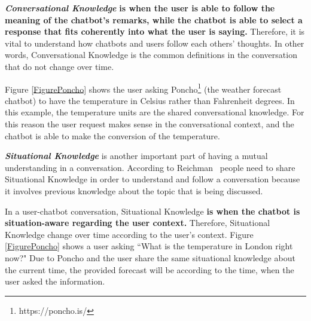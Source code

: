 \documentclass[a4paper,10pt]{article}
\begin{document}

\textbf{\textit{Conversational Knowledge}} \textbf{is when the user is able to follow the meaning of the chatbot's remarks, while the chatbot is able to select a response that fits coherently into what the user is saying.} Therefore, it is vital to understand how chatbots and users follow each others' thoughts. In other words, Conversational Knowledge is the common definitions in the conversation that do not change over time. 

Figure \ref{FigurePoncho} shows the user asking Poncho\footnote{https://poncho.is/} (the weather forecast chatbot) to have the temperature in Celsius rather than Fahrenheit degrees. In this example, the temperature units are the shared conversational knowledge. For this reason the user request makes sense in the conversational context, and the chatbot is able to make the conversion of the temperature.     


\textbf{\textit{Situational Knowledge}} is another important part of having a mutual understanding in a conversation. According to Reichman~\cite{reichman1985getting} people need to share Situational Knowledge in order to understand and follow a conversation because it involves previous knowledge about the topic that is being discussed.  

In a user-chatbot conversation, Situational Knowledge \textbf{is when the chatbot is situation-aware regarding the user context.} Therefore, Situational Knowledge change over time according to the user's context. Figure \ref{FigurePoncho} shows a user asking ``What is the temperature in London right now?" Due to Poncho and the user share the same situational knowledge about the current time, the provided forecast will be according to the time, when the user asked the information. 

\end{document}
